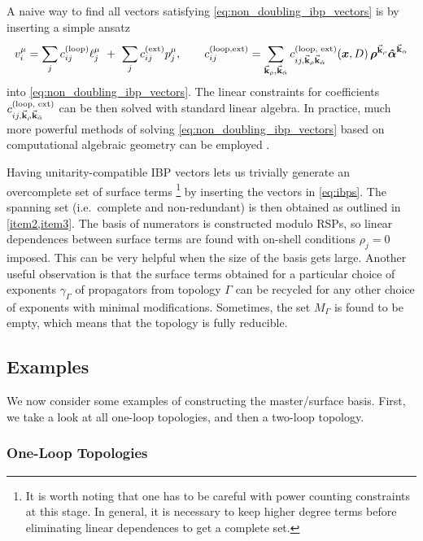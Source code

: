 {
  \def\coeff{c^{(\text{loop, ext})}_{ij,\va{k}_\rho \va{k}_{\hat{\alpha}}}}
  A naive way to find all vectors satisfying \cref{eq:non_doubling_ibp_vectors}
  is by inserting a simple ansatz
  \begin{equation} \label{eq:unitarity_compaible_ibp_ansatz}
    v_i^\mu = \sum_{j}^{}c^{(\text{loop})}_{ij}\ell^\mu_j ~+~  \sum_{j}^{}c^{(\text{ext})}_{ij} p^\mu_j, \qquad
    c_{ij}^{(\text{loop,ext})} = \sum_{\va{k}_\rho, \va{k}_{\hat{\alpha}}} \coeff (\vb*{x},D)\, \vb*{\rho}^{\va{k}_\rho}\vb*{\hat{\alpha}}^{\va{k}_\alpha}
  \end{equation}
  into \cref{eq:non_doubling_ibp_vectors}.
  The linear constraints for coefficients $\coeff$ can be then solved with standard linear algebra.
}%
In practice, much more powerful methods of solving \cref{eq:non_doubling_ibp_vectors}  based on computational
algebraic geometry can be employed \cite{Larsen:2015ped,Boehm:2018fpv,Zhang:2016kfo,Abreu:2017xsl,Bendle2019}.

Having unitarity-compatible IBP vectors lets us trivially generate an overcomplete set of surface terms%
\footnote{
  It is worth noting that one has to be careful with power counting constraints at this stage.
  In general, it is necessary to keep higher degree terms before eliminating linear dependences to get a complete set.
}
by inserting the vectors in \cref{eq:ibps}.
The spanning set (i.e.\ complete and non-redundant) is then obtained as outlined in \cref{item2,item3}.
The basis of numerators is constructed modulo RSPs, so
linear dependences between surface terms are found with on-shell conditions $\rho_j=0$ imposed.
This can be very helpful when the size of the basis gets large.
Another useful observation is that the surface terms obtained for a particular choice of exponents $\gamma_\Gamma$
of propagators from topology $\Gamma$ 
can be recycled for any other choice of exponents with minimal modifications.
Sometimes, the set $M_\Gamma$ is found to be empty, which means that the topology is fully reducible.


\subsection{Examples}
\label{sec:ms_examples}

We now consider some examples of constructing the master/surface basis.
First, we take a look at all one-loop topologies, 
and then a two-loop topology.

\subsubsection{One-Loop Topologies}

